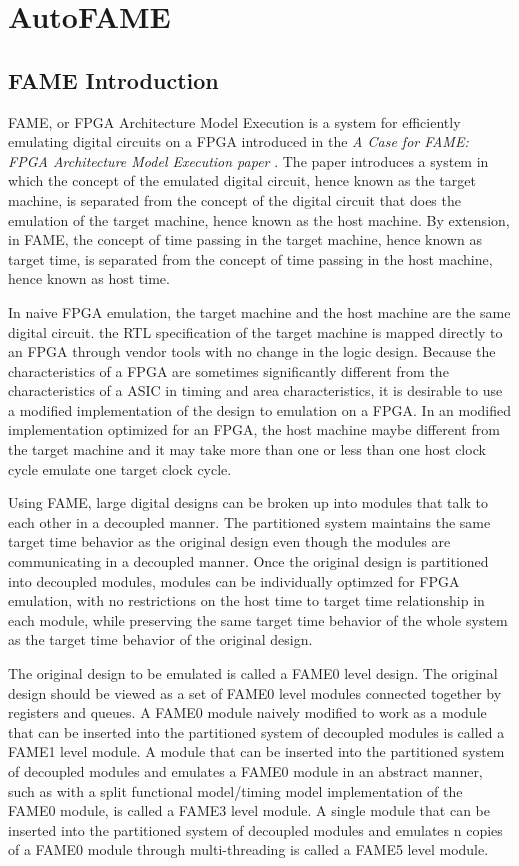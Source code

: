 \section{AutoFAME}
\subsection{FAME Introduction}
FAME, or FPGA Architecture Model Execution is a system for efficiently emulating digital circuits on a FPGA introduced in the \textit{A Case for FAME: FPGA Architecture Model Execution paper} \cite{FAME:2010}. The paper introduces a system in which the concept of the emulated digital circuit, hence known as the target machine, is separated from the concept of the digital circuit that does the emulation of the target machine, hence known as the host machine. By extension, in FAME, the concept of time passing in the target machine, hence known as target time, is separated from the concept of time passing in the host machine, hence known as host time. 

In naive FPGA emulation, the target machine and the host machine are the same digital circuit. the RTL specification of the target machine is mapped directly to an FPGA through vendor tools with no change in the logic design. Because the characteristics of a FPGA are sometimes significantly different from the characteristics of a ASIC in timing and area characteristics, it is desirable to use a modified implementation of the design to emulation on a FPGA. In an modified implementation optimized for an FPGA, the host machine maybe different from the target machine and it may take more than one or less than one host clock cycle emulate one target clock cycle.

Using FAME, large digital designs can be broken up into modules that talk to each other in a decoupled manner. The partitioned system maintains the same target time behavior as the original design even though the modules are communicating in a decoupled manner. Once the original design is partitioned into decoupled modules, modules can be individually optimzed for FPGA emulation, with no restrictions on the host time to target time relationship in each module, while preserving the same target time behavior of the whole system as the target time behavior of the original design.

The original design to be emulated is called a FAME0 level design. The original design should be viewed as a set of FAME0 level modules connected together by registers and queues. A FAME0 module naively modified to work as a module that can be inserted into the partitioned system of decoupled modules is called a FAME1 level module. A module that can be inserted into the partitioned system of decoupled modules and emulates a FAME0 module in an abstract manner, such as with a split functional model/timing model implementation of the FAME0 module, is called a FAME3 level module. A single module that can be inserted into the partitioned system of decoupled modules and emulates n copies of a FAME0 module through multi-threading is called a FAME5 level module. 

